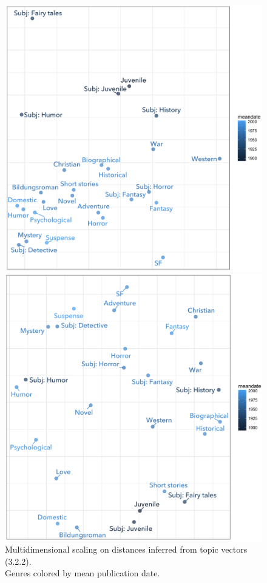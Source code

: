 \documentclass[11pt]{article}
\begin{document}
\begin{figure}[t!]
\centering
\begin{minipage}{.47\textwidth}
  \centering
  \includegraphics[width=\textwidth]{sanstopicmap.png}
  \caption{Multidimensional scaling on distances inferred from topic vectors (3.2.2).\\Genres colored by mean publication date.}
  \label{fig:topicmap2}
\end{minipage}%
\hfill
\begin{minipage}{.47\textwidth}
  \includegraphics[width=\textwidth]{predictivetopicmap.png}

\end{minipage}
\end{figure}
\end{document}
